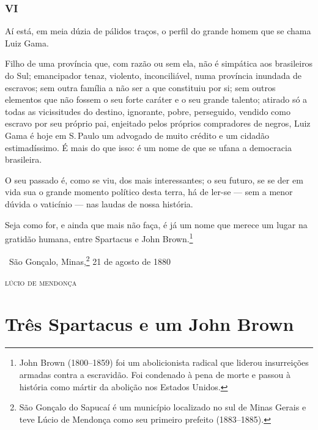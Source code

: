 \section*{VI}

Aí está, em meia dúzia de pálidos traços, o perfil do grande homem que
se chama Luiz Gama.

Filho de uma província que, com razão ou sem ela, não é simpática aos
brasileiros do Sul; emancipador tenaz, violento, inconciliável, numa
província inundada de escravos; sem outra família a não ser a que
constituiu por si; sem outros elementos que não fossem o seu forte
caráter e o seu grande talento; atirado só a todas as vicissitudes do
destino, ignorante, pobre, perseguido, vendido como escravo por seu
próprio pai, enjeitado pelos próprios compradores de negros, Luiz Gama é
hoje em S.\,Paulo um advogado de muito crédito e um cidadão
estimadíssimo. É mais do que isso: é um nome de que se ufana a
democracia brasileira.

O seu passado é, como se viu, dos mais interessantes; o seu futuro, se
se der em vida sua o grande momento político desta terra, há de ler-se
--- sem a menor dúvida o vaticínio --- nas laudas de nossa história.

Seja como for, e ainda que mais não faça, é já um nome que merece um
lugar na gratidão humana, entre Spartacus e John Brown.\footnote{John
  Brown (1800--1859) foi um abolicionista radical que liderou \label{brown}
  insurreições armadas contra a escravidão. Foi condenado à pena de
  morte e passou à história como mártir da abolição nos Estados Unidos.}

\medskip

\hfill\ São Gonçalo, Minas,\footnote{São Gonçalo do Sapucaí é um município
  localizado no sul de Minas Gerais e teve Lúcio de Mendonça como seu
  primeiro prefeito (1883--1885).} 21 de agosto de 1880

\hfill\textsc{lúcio de mendonça}

\part{Três Spartacus e um John Brown}

